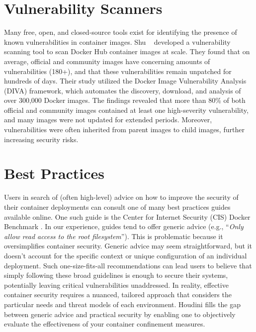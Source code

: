 \documentclass[12pt]{report}
\begin{document}
\begin{doublespace}
\section{Vulnerability Scanners} 

Many free, open, and closed-source tools exist for identifying the presence of known vulnerabilities in container images. Shu \etal~\cite{shu2017study} developed a vulnerability scanning tool to scan Docker Hub container images at scale. They found that on average, official and community images have concerning amounts of vulnerabilities (180+), and that these vulnerabilities remain unpatched for hundreds of days. Their study utilized the Docker Image Vulnerability Analysis (DIVA) framework, which automates the discovery, download, and analysis of over 300,000 Docker images. The findings revealed that more than 80\% of both official and community images contained at least one high-severity vulnerability, and many images were not updated for extended periods. Moreover, vulnerabilities were often inherited from parent images to child images, further increasing security risks.\\

\section{Best Practices} 

Users in search of (often high-level) advice on how to improve the security of their container deployments can consult one of many best practices guides available online. One such guide is the Center for Internet Security (CIS) Docker Benchmark \cite{CIS}. In our experience, guides tend to offer generic advice (e.g., ``\textit{Only allow read access to the root filesystem}''). This is problematic because it oversimplifies container security. Generic advice may seem straightforward, but it doesn't account for the specific context or unique configuration of an individual deployment. Such one-size-fits-all recommendations can lead users to believe that simply following these broad guidelines is enough to secure their systems, potentially leaving critical vulnerabilities unaddressed. In reality, effective container security requires a nuanced, tailored approach that considers the particular needs and threat models of each environment. Houdini fills the gap between generic advice and practical security by enabling one to objectively evaluate the effectiveness of your container confinement measures.\\


\end{doublespace}
\end{document}
